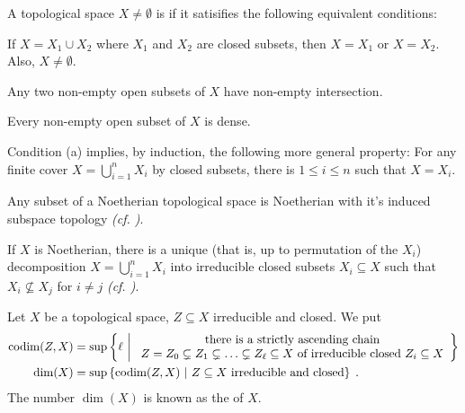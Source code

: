 \documentclass[a4paper,parskip=half,numbers=enddot, DIV=12]{scrreprt}
\begin{document}
\begin{defi}
	A topological space $X\not=\emptyset$ is  if it satisifies the following equivalent conditions:
	\begin{alphanumerate}
		\item If $X = X_1\cup X_2$ where $X_1$ and $X_2$ are closed subsets, then $X=X_1$ or $X=X_2$. Also, $X\neq\emptyset$.
		\item Any two non-empty open subsets of $X$ have non-empty intersection.
		\item Every non-empty open subset of $X$ is dense.
	\end{alphanumerate}
\end{defi}
Condition (a) implies, by induction, the following more general property: 
For any finite cover $X= \bigcup_{i=1}^n X_i$ by closed subsets, there is $1\leq i\leq n$ such that $X=X_i$.
\begin{prop}
	\begin{alphanumerate}
		\item 
		Any subset of a Noetherian topological space is Noetherian with it's induced subspace topology \emph{(cf. \cite[Remark~2.2.1]{alg1})}. 
		\item 
		If $X$ is Noetherian, there is a unique (that is, up to permutation of the $X_i$) decomposition $X = \bigcup_{i=1}^n X_i$ into irreducible closed subsets $X_i\subseteq X$ such that $X_i\not\subseteq X_j$ for $i\neq j$ \emph{(cf. \cite[Proposition~2.1.1]{alg1})}.
	\end{alphanumerate}
	
\end{prop}
\begin{defi}
	Let $X$ be a topological space, $Z\subseteq X$ irreducible and closed. We put 
	\begin{align*}
	\operatorname{codim}(Z,X) &= \sup\left\{\ell\ \middle|\  
	\begin{array}{c}
	\text{there is a strictly ascending chain}\\
	Z=Z_0 \subsetneq Z_1\subsetneq \ldots \subsetneq Z_\ell\subseteq X\text{ of irreducible closed }Z_i\subseteq X
	\end{array}\right\}\\
	\dim(X) &= \sup\left\{\operatorname{codim}(Z,X)\ \middle|\  Z\subseteq X \text{ irreducible and closed}\right\}\;.
	\end{align*}
	The number $\dim(X)$ is known as the  of $X$.
\end{defi}
\end{document}
